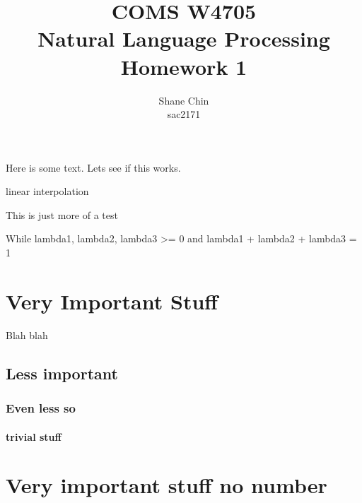 \documentclass[12pt]{article}
\title{COMS W4705 \\ Natural Language Processing\\Homework 1}
\author{Shane Chin\\sac2171}
\date{}
\begin{document}
\maketitle
Here is some text.
Lets see if this works.

linear interpolation

This is just more of a test

While lambda1, lambda2, lambda3 >= 0
and lambda1 + lambda2 + lambda3 = 1

\section{Very Important Stuff}
Blah blah 

\subsection{Less important}

\subsubsection{Even less so }

\paragraph{trivial stuff}

\section*{Very important stuff no number}
\end{document}
